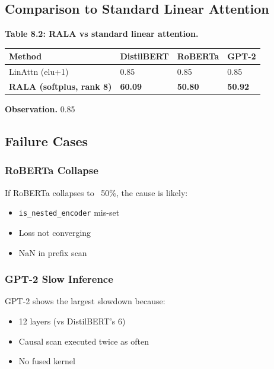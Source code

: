 \subsection{Comparison to Standard Linear Attention}

\textbf{Table 8.2: RALA vs standard linear attention.}

\begin{table}[H]
\centering
\small
\begin{tabular}{llll}
\toprule
\textbf{Method} & \textbf{DistilBERT} & \textbf{RoBERTa} & \textbf{GPT-2} \\
\midrule
LinAttn (elu+1) & 0.85 & 0.85 & 0.85 \\
\textbf{RALA (softplus, rank 8)} & \textbf{60.09} & \textbf{50.80} & \textbf{50.92} \\
\bottomrule
\end{tabular}
\end{table}

\textbf{Observation.} 0.85

\subsection{Failure Cases}

\subsubsection{RoBERTa Collapse}

If RoBERTa collapses to ~50\%, the cause is likely:

\begin{itemize}
\item \texttt{is\_nested\_encoder} mis-set
\item Loss not converging
\item NaN in prefix scan

\end{itemize}
\subsubsection{GPT-2 Slow Inference}

GPT-2 shows the largest slowdown because:
\begin{itemize}
\item 12 layers (vs DistilBERT's 6)
\item Causal scan executed twice as often
\item No fused kernel

\end{itemize}
